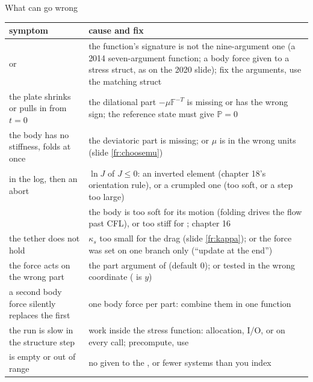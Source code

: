 \documentclass[aspectratio=169,11pt]{beamer}
\begin{document}
\begin{frame}{What can go wrong}
\label{fr:wrong}
\scriptsize
\begin{tabular}{@{}L{0.40\textwidth}L{0.52\textwidth}@{}}
\toprule
symptom & cause and fix \\
\midrule
{} or  & the function's signature is not the nine-argument one (a 2014 seven-argument function; a body force given to a stress struct, as on the 2020 slide); fix the arguments, use the matching struct \\
the plate shrinks or pulls in from $t = 0$ & the dilational part $-\mu\mathbb{F}^{-T}$ is missing or has the wrong sign; the reference state must give $\mathbb{P} = 0$ \\
the body has no stiffness, folds at once & the deviatoric part is missing; or $\mu$ is in the wrong units (slide \ref{fr:choosemu}) \\
 in the log, then an abort & $\ln J$ of $J \le 0$: an inverted element (chapter 18's orientation rule), or a crumpled one (too soft, or a step too large) \\
 & the body is too soft for its motion (folding drives the flow past CFL), or too stiff for ; chapter 16 \\
the tether does not hold & $\kappa_s$ too small for the drag (slide \ref{fr:kappa}); or the force was set on one branch only (``update  at the end'') \\
the force acts on the wrong part & the part argument of  (default $0$); or  tested in the wrong coordinate ( is $y$) \\
a second body force silently replaces the first & one body force per part: combine them in one function \\
the run is slow in the structure step & work inside the stress function: allocation, I/O, or  on every call; precompute, use  \\
 is empty or out of range & no  given to the , or fewer systems than you index \\
\bottomrule
\end{tabular}

\end{frame}
\end{document}
